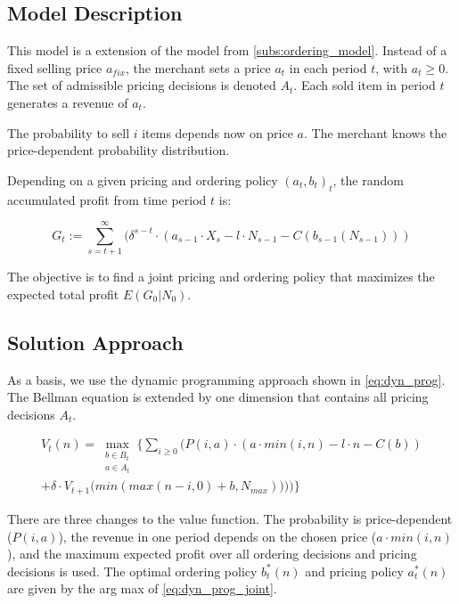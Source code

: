 \subsection{Model Description}
\label{subs:joint_model}
This model is a extension of the model from \cref{subs:ordering_model}.
Instead of a fixed selling price $a_{fix}$, the merchant sets a price $a_t$ in each period $t$, with $a_t \geq 0$.
The set of admissible pricing decisions is denoted $A_t$.
Each sold item in period $t$ generates a revenue of $a_t$.

The probability to sell $i$ items depends now on price $a$.
The merchant knows the price-dependent probability distribution.

Depending on a given pricing and ordering policy $(a_t, b_t)_t$, the random accumulated profit from time period $t$ is:

$$
G_t := \sum_{s=t+1}^{\infty} (\delta^{s-t} \cdot (a_{s-1} \cdot X_s - l \cdot N_{s-1} - C(b_{s-1}(N_{s-1})))
$$

The objective is to find a joint pricing and ordering policy that maximizes the expected total profit $E(G_0 | N_0)$.

\subsection{Solution Approach}
\label{section:joint_solution}
As a basis, we use the dynamic programming approach shown in \cref{eq:dyn_prog}.
The Bellman equation is extended by one dimension that contains all pricing decisions $A_t$.

\begin{equation}
\begin{split}
V_t(n) = \max_{\substack{b \in B_t \\ a \in A_t}} \Bigg\{
\sum_{i \geq 0} \Big(
P(i, a) \cdot (
a \cdot min(i, n) %
- l \cdot n %
- C(b) %
) \\
+ \delta \cdot V_{t+1}\big(min(max(n - i, 0) + b, N_{max}))\big)
\Big)\Bigg\}
\end{split}
\label{eq:dyn_prog_joint}
\end{equation}

There are three changes to the value function.
The probability is price-dependent ($P(i, a)$), the revenue in one period depends on the chosen price ($a \cdot min(i, n)$), and the maximum expected profit over all ordering decisions and pricing decisions is used.
The optimal ordering policy $b^*_t(n)$ and pricing policy $a^*_t(n)$ are given by the arg max of \cref{eq:dyn_prog_joint}.

